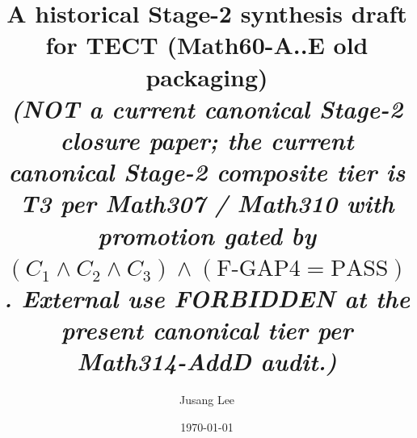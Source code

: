 



\title{A historical Stage-2 synthesis draft for TECT (Math60-A..E
old packaging) \\
\normalsize{\textit{(NOT a current canonical Stage-2 closure paper;
the current canonical Stage-2 composite tier is T3 per Math307 /
Math310 with promotion gated by $(C_1 \wedge C_2 \wedge C_3)
\wedge (\text{F-GAP4}=\text{PASS})$. External use FORBIDDEN at the
present canonical tier per Math314-AddD audit.)}}}

\author{Jusang Lee}

\date{\today}

